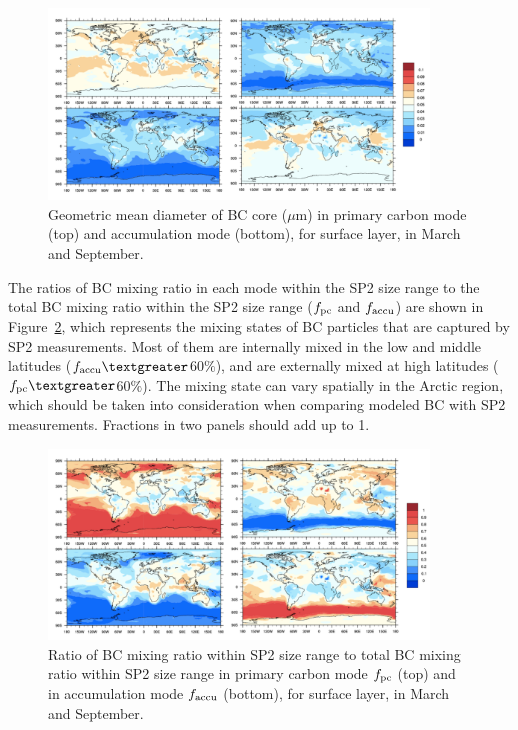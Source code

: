 \documentclass[12pt]{article}
\begin{document}
	\begin{figure}[H] 
		\begin{center}
			\includegraphics[width = 0.9\textwidth]{Rplot03}
			\caption[]{\label{fig_R6} Geometric mean diameter of BC core ($\mu$m) in primary carbon mode (top) and accumulation mode (bottom), for surface layer, in March and September.}
		\end{center}
	\end{figure}
	
	
	
	The ratios of BC mixing ratio in each mode within the SP2 size range to the total BC mixing ratio within the SP2 size range ($f_{\rm pc}$ and $f_{\rm accu}$) are shown in Figure~\ref{fig_R7}, which represents the mixing states of BC particles that are captured by SP2 measurements. Most of them are internally mixed in the low and middle
	latitudes ($f_{\rm accu}\textgreater$60$\%$), and are externally mixed at high latitudes ($f_{\rm pc}\textgreater$60$\%$). The mixing state can vary spatially in the Arctic region,
	which should be taken into consideration when comparing modeled BC
	with SP2 measurements. Fractions in two panels should add up to 1.
	
	
	
	\begin{figure}[H] 
		\begin{center}
			\includegraphics[width = 0.9\textwidth]{Rplot04}
			\caption[]{\label{fig_R7} Ratio of BC mixing ratio within SP2 size range to total BC mixing ratio within SP2 size range in primary carbon mode $f_{\rm pc}$ (top) and in accumulation mode $f_{\rm accu}$ (bottom), for surface layer, in March and September.}
		\end{center}
	\end{figure}
	
\end{document}
